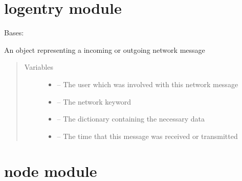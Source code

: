 \documentclass[letterpaper,10pt,english]{sphinxmanual}
\begin{document}
\section{logentry module}
\label{\detokenize{logentry:module-logentry}}\label{\detokenize{logentry::doc}}\label{\detokenize{logentry:logentry-module}}

\begin{fulllineitems}
\label{\detokenize{logentry:logentry.LogEntry}}
Bases: 

An object representing a incoming or outgoing network message
\begin{quote}\begin{description}
\item[{Variables}] \leavevmode\begin{itemize}
\item {} 
{\hyperref[\detokenize{user:module-user}]{}} -- The user which was involved with this network message

\item {} 
\href{https://docs.python.org/2/library/keyword.html\#module-keyword}{} -- The network keyword

\item {} 
 -- The dictionary containing the necessary data

\item {} 
\href{https://docs.python.org/2/library/time.html\#module-time}{} -- The time that this message was received or transmitted

\end{itemize}

\end{description}\end{quote}

\end{fulllineitems}



\section{node module}
\label{\detokenize{node:node-module}}\label{\detokenize{node::doc}}\label{\detokenize{node:module-node}}
\end{document}
